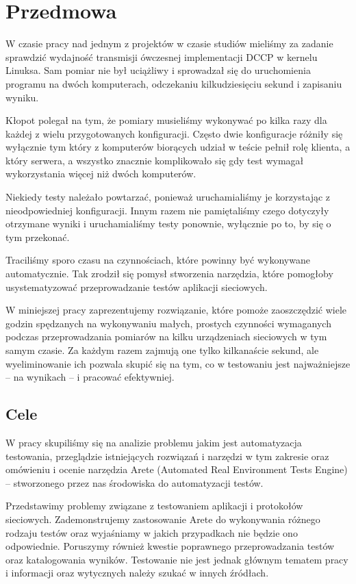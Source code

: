 \documentclass[00-praca-magisterska.tex]{subfiles}
\begin{document}
\chapter{Przedmowa}

W czasie pracy nad jednym z projektów w czasie studiów mieliśmy za zadanie
sprawdzić wydajność transmisji ówczesnej implementacji DCCP w kernelu Linuksa.
Sam pomiar nie był uciążliwy i sprowadzał się do uruchomienia programu na dwóch
komputerach, odczekaniu kilkudziesięciu sekund i zapisaniu wyniku.

Kłopot polegał na tym, że pomiary musieliśmy wykonywać po kilka razy dla
każdej z wielu przygotowanych konfiguracji. Często dwie konfiguracje różniły się
wyłącznie tym który z komputerów biorących udział w teście pełnił rolę klienta,
a który serwera, a wszystko znacznie komplikowało się gdy test wymagał
wykorzystania więcej niż dwóch komputerów.

Niekiedy testy należało powtarzać, ponieważ uruchamialiśmy je korzystając z
nieodpowiedniej konfiguracji. Innym razem nie pamiętaliśmy czego dotyczyły
otrzymane wyniki i uruchamialiśmy testy ponownie, wyłącznie po to, by się o tym
przekonać.

Traciliśmy sporo czasu na czynnościach, które powinny być wykonywane
automatycznie. Tak zrodził się pomysł stworzenia narzędzia, które
pomogłoby usystematyzować przeprowadzanie testów aplikacji sieciowych.

W miniejszej pracy zaprezentujemy rozwiązanie, które pomoże zaoszczędzić wiele
godzin spędzanych na wykonywaniu małych, prostych czynności wymaganych podczas
przeprowadzania pomiarów na kilku urządzeniach sieciowych w tym samym czasie.
Za każdym razem zajmują one tylko kilkanaście sekund, ale wyeliminowanie ich
pozwala skupić się na tym, co w testowaniu jest najważniejsze -- na wynikach --
i pracować efektywniej.

\section{Cele}

W pracy skupiliśmy się na analizie problemu jakim jest automatyzacja
testowania, przeglądzie istniejących rozwiązań i narzędzi w tym zakresie oraz
omówieniu i ocenie narzędzia Arete (Automated Real Environment Tests Engine) --
stworzonego przez nas środowiska do automatyzacji testów.

Przedstawimy problemy związane z testowaniem aplikacji i protokołów sieciowych.
Zademonstrujemy zastosowanie Arete do wykonywania różnego rodzaju testów oraz
wyjaśniamy w jakich przypadkach nie będzie ono odpowiednie.  Poruszymy również
kwestie poprawnego przeprowadzania testów oraz katalogowania wyników.
Testowanie nie jest jednak głównym tematem pracy i informacji oraz wytycznych
należy szukać w innych źródłach.
\end{document}
